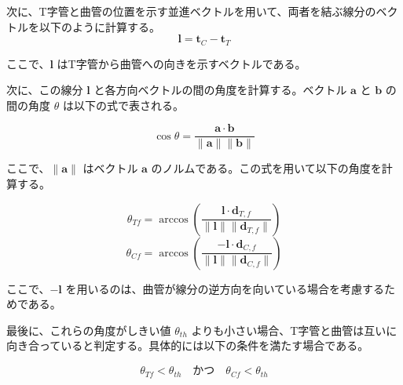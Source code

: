 次に、T字管と曲管の位置を示す並進ベクトルを用いて、両者を結ぶ線分のベクトルを以下のように計算する。
\[
\mathbf{l} = \mathbf{t}_C - \mathbf{t}_T
\]

ここで、$\mathbf{l}$ はT字管から曲管への向きを示すベクトルである。

次に、この線分 $\mathbf{l}$ と各方向ベクトルの間の角度を計算する。ベクトル $\mathbf{a}$ と $\mathbf{b}$ の間の角度 $\theta$ は以下の式で表される。

\[
\cos \theta = \frac{\mathbf{a} \cdot \mathbf{b}}{\|\mathbf{a}\| \|\mathbf{b}\|}
\]

ここで、$\|\mathbf{a}\|$ はベクトル $\mathbf{a}$ のノルムである。この式を用いて以下の角度を計算する。

\[
\theta_{Tf} = \arccos \left( \frac{\mathbf{l} \cdot \mathbf{d}_{T,f}}{\|\mathbf{l}\| \|\mathbf{d}_{T,f}\|} \right)
\]
\[
\theta_{Cf} = \arccos \left( \frac{-\mathbf{l} \cdot \mathbf{d}_{C,f}}{\|\mathbf{l}\| \|\mathbf{d}_{C,f}\|} \right)
\]

ここで、$-\mathbf{l}$ を用いるのは、曲管が線分の逆方向を向いている場合を考慮するためである。

最後に、これらの角度がしきい値 $\theta_{th}$ よりも小さい場合、T字管と曲管は互いに向き合っていると判定する。具体的には以下の条件を満たす場合である。

\[
\theta_{Tf} < \theta_{th} \quad \text{かつ} \quad \theta_{Cf} < \theta_{th}
\]

